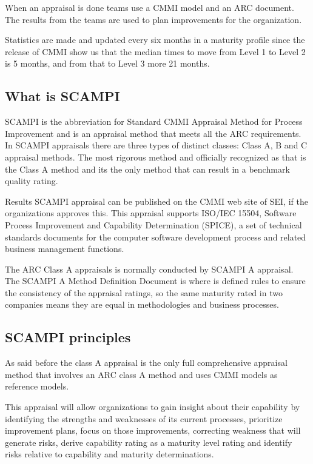 When an appraisal is done teams use a CMMI model and an ARC document. The results from the teams are used to plan improvements for the organization.

Statistics are made and updated every six months in a maturity profile since the release of CMMI show us that the median times to move from Level 1 to Level 2 is 5 months, and from that to Level 3 more 21 months.

\subsection{What is SCAMPI}
SCAMPI is the abbreviation for Standard CMMI Appraisal Method for Process Improvement and is an appraisal method that meets all the ARC requirements.
In SCAMPI appraisals there are three types of distinct classes: Class A, B and C appraisal methods. The most rigorous method and officially recognized as that is the Class A method and its the only method that can result in a benchmark quality rating. 

Results SCAMPI appraisal can be published on the CMMI web site of SEI, if the organizations approves this. This appraisal supports ISO/IEC 15504, Software Process Improvement and Capability Determination (SPICE), a set of technical standards documents for the computer software development process and related business management functions.

The ARC Class A appraisals is normally conducted by SCAMPI A appraisal. The SCAMPI A Method Definition Document is where is defined rules to ensure the consistency of the appraisal ratings, so the same maturity rated in two companies means they are equal in methodologies and business processes.


\subsection{SCAMPI principles}
As said before the class A appraisal is the only full comprehensive appraisal method that involves an ARC class A method and uses CMMI models as reference models.

This appraisal will allow organizations to gain insight about their capability by identifying the strengths and weaknesses of its current processes, prioritize improvement plans, focus on those improvements, correcting weakness that will generate risks, derive capability rating as a maturity level rating and identify risks relative to capability and maturity determinations.

